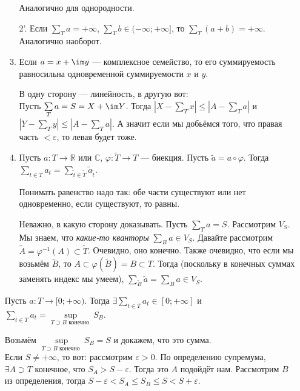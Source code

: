 \documentclass{article}
\begin{document}
\begin{itemize}
\begin{enumerate}[1.]
\begin{Proof}
                Аналогично для однородности.
            \end{Proof}
            \item[2'.] Если $\sum\limits_T a=+\infty$, $\sum\limits_T b\in(-\infty;+\infty]$, то $\sum\limits_T(a+b)=+\infty$. Аналогично наоборот.
            \item Если $a=x+\im y$ --- комплексное семейство, то его суммируемость равносильна одновременной суммируемости $x$ и $y$.
            \begin{Proof}
                В одну сторону --- линейность, в другую вот:\\
                Пусть $\sum\limits_T a=S=X+\im Y$. Тогда $\left|X-\sum\limits_T x\right|\leqslant\left|A-\sum\limits_T a\right|$ и $\left|Y-\sum\limits_T y\right|\leqslant\left|A-\sum\limits_T a\right|$. А значит если мы добьёмся того, что правая часть $<\varepsilon$, то левая будет тоже.
            \end{Proof}
            \item Пусть $a\colon T\to\mathbb R$ или $\mathbb C$, $\varphi\colon\tilde T\to T$ --- биекция. Пусть $\tilde a=a\circ\varphi$. Тогда $\sum\limits_{t\in T} a_t=\sum\limits_{\tilde t\in\tilde T}\tilde a_{\tilde t}$.
            \begin{Comment}
                Понимать равенство надо так: обе части существуют или нет одновременно, если существуют, то равны.
            \end{Comment}
            \begin{Proof}
                Неважно, в какую сторону доказывать. Пусть $\sum\limits_Ta=S$. Рассмотрим $V_S$. Мы знаем, что \textit{какие-то кванторы} $\sum\limits_Ba\in V_S$. Давайте рассмотрим $\tilde A=\varphi^{-1}(A)\subset\tilde T$. Очевидно, оно конечно. Также очевидно, что если мы возьмём $\tilde B$, то $A\subset\varphi(\tilde B)=B\subset T$. Тогда (поскольку в конечных суммах заменять индекс мы умеем), $\sum\limits_{\tilde B}\tilde a=\sum\limits_B a\in V_S$.
            \end{Proof}
        \end{enumerate}
        \thm Пусть $a\colon T\to[0;+\infty)$. Тогда $\exists\sum\limits_{t\in T}a_t\in[0;+\infty]$ и $\sum\limits_{t\in T}a_t=\sup\limits_{T\supset B\text{ конечно }}S_B$.
        \begin{Proof}
            Возьмём $\sup\limits_{T\supset B\text{ конечно }}S_B=S$ и докажем, что это сумма.\\
            Если $S\neq+\infty$, то вот: рассмотрим $\varepsilon>0$. По определению супремума, $\exists A\supset T$ конечное, что $S_A>S-\varepsilon$. Тогда это $A$ подойдёт нам. Рассмотрим $B$ из определения, тогда $S-\varepsilon<S_A\leqslant S_B\leqslant S<S+\varepsilon$.\\

\end{Proof}
\end{itemize}
\end{document}
